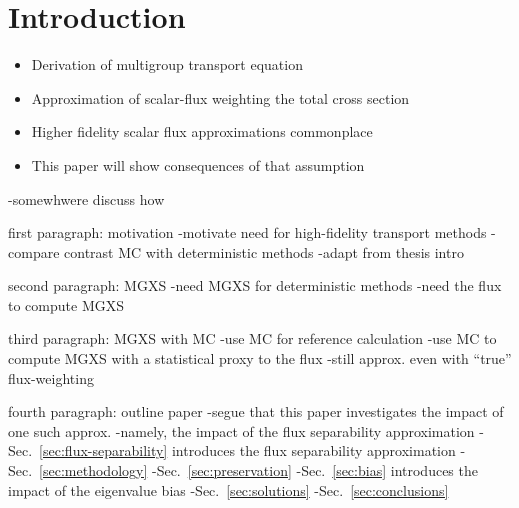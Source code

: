 \section{Introduction}
\label{sec:intro}

\begin{itemize}
\item Derivation of multigroup transport equation
\item Approximation of scalar-flux weighting the total cross section
\item Higher fidelity scalar flux approximations commonplace
\item This paper will show consequences of that assumption
\end{itemize}

-somewhwere discuss how 

first paragraph: motivation
-motivate need for high-fidelity transport methods
-compare contrast MC with deterministic methods
-adapt from thesis intro

second paragraph: MGXS
-need MGXS for deterministic methods
-need the flux to compute MGXS

third paragraph: MGXS with MC
-use MC for reference calculation
-use MC to compute MGXS with a statistical proxy to the flux
-still approx. even with ``true'' flux-weighting

fourth paragraph: outline paper
-segue that this paper investigates the impact of one such approx.
  -namely, the impact of the flux separability approximation
-Sec.~\ref{sec:flux-separability} introduces the flux separability approximation
-Sec.~\ref{sec:methodology}
-Sec.~\ref{sec:preservation}
-Sec.~\ref{sec:bias} introduces the impact of the eigenvalue bias
-Sec.~\ref{sec:solutions}
-Sec.~\ref{sec:conclusions}